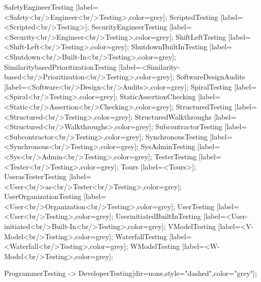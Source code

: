 \documentclass{article}
\begin{document}
{SafetyEngineerTesting [label=<Safety<br/>Engineer<br/>Testing>,color=grey];
ScriptedTesting [label=<Scripted<br/>Testing>];
SecurityEngineerTesting [label=<Security<br/>Engineer<br/>Testing>,color=grey];
ShiftLeftTesting [label=<Shift-Left<br/>Testing>,color=grey];
ShutdownBuiltInTesting [label=<Shutdown<br/>Built-In<br/>Testing>,color=grey];
SimilaritybasedPrioritizationTesting [label=<Similarity-based<br/>Prioritization<br/>Testing>,color=grey];
SoftwareDesignAudits [label=<Software<br/>Design<br/>Audits>,color=grey];
SpiralTesting [label=<Spiral<br/>Testing>,color=grey];
StaticAssertionChecking [label=<Static<br/>Assertion<br/>Checking>,color=grey];
StructuredTesting [label=<Structured<br/>Testing>,color=grey];
StructuredWalkthroughs [label=<Structured<br/>Walkthroughs>,color=grey];
SubcontractorTesting [label=<Subcontractor<br/>Testing>,color=grey];
SynchronousTesting [label=<Synchronous<br/>Testing>,color=grey];
SysAdminTesting [label=<Sys<br/>Admin<br/>Testing>,color=grey];
TesterTesting [label=<Tester<br/>Testing>,color=grey];
Tours [label=<Tours>];
UserasTesterTesting [label=<User<br/>as<br/>Tester<br/>Testing>,color=grey];
UserOrganizationTesting [label=<User<br/>Organization<br/>Testing>,color=grey];
UserTesting [label=<User<br/>Testing>,color=grey];
UserinitiatedBuiltInTesting [label=<User-initiated<br/>Built-In<br/>Testing>,color=grey];
VModelTesting [label=<V-Model<br/>Testing>,color=grey];
WaterfallTesting [label=<Waterfall<br/>Testing>,color=grey];
WModelTesting [label=<W-Model<br/>Testing>,color=grey];

ProgrammerTesting -> DeveloperTesting[dir=none,style="dashed",color="grey"];

}
\end{document}
